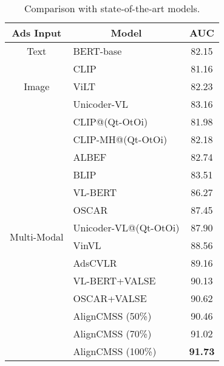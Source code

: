 \documentclass[letterpaper]{article} \usepackage{aaai24}  \usepackage{times}  \usepackage{helvet}  \usepackage{courier}  \usepackage[hyphens]{url}  \usepackage{graphicx} \urlstyle{rm} \def\UrlFont{\rm}  \usepackage{natbib}  \usepackage{caption} \frenchspacing  \setlength{\pdfpagewidth}{8.5in}  \setlength{\pdfpageheight}{11in}
\begin{document}
 \begin{table}[t]
\centering
\scalebox{1.1}
{\scriptsize
\renewcommand\arraystretch{1.1}
\setlength{\tabcolsep}{1.4mm}
\begin{tabular}{l|l|c}
\toprule
\multicolumn{1}{c|}{\textbf{Ads Input}}              & \multicolumn{1}{c|}{\textbf{Model}} & \textbf{AUC}   \\ \hline
\multicolumn{1}{c|}{Text}                   & BERT-base \cite{devlin2019bert}                & 82.15 \\ \hline
\multicolumn{1}{c|}{\multirow{3}{*}{Image}} & CLIP \cite{radford2021learning}                     & 81.16 \\
\multicolumn{1}{c|}{}                       & ViLT \cite{pmlr-v139-kim21k}                      & 82.23 \\
\multicolumn{1}{c|}{}                       & Unicoder-VL \cite{Li_Duan_Fang_Gong_Jiang_2020}              & 83.16 \\ \hline
\multirow{14}{*}{Multi-Modal}                & CLIP@(Qt-OtOi) \cite{10.1145/3503161.3548226}           & 81.98 \\
                                            & CLIP-MH@(Qt-OtOi) \cite{10.1145/3503161.3548226}        & 82.18 \\
                                            & ALBEF \cite{NEURIPS2021_50525975}       & 82.74 \\
                                            & BLIP \cite{pmlr-v162-li22n}       & 83.51 \\
& VL-BERT \cite{su2020vl-bert}    & 86.27 \\  
                                            & OSCAR \cite{li2020oscar}                    & 87.45 \\
                                            & Unicoder-VL@(Qt-OtOi) \cite{10.1145/3503161.3548226}    & 87.90 \\                            
                                            & VinVL \cite{zhang2021vinvl}     & 88.56 \\
                                            & AdsCVLR \cite{10.1145/3503161.3548226}                  & 89.16 \\ \cline{2-3} 
                                            & VL-BERT+VALSE              & 90.13     \\
                                            & OSCAR+VALSE              & 90.62       \\
                                            & AlignCMSS (50\%)              & 90.46       \\
                                            & AlignCMSS (70\%)             & 91.02       \\
                                            & AlignCMSS (100\%)              & \textbf{91.73} \\ \bottomrule
\end{tabular}}
\caption{Comparison with state-of-the-art models.
}
\vspace{-10pt}
\label{tab:sota}
\end{table}
\end{document}
